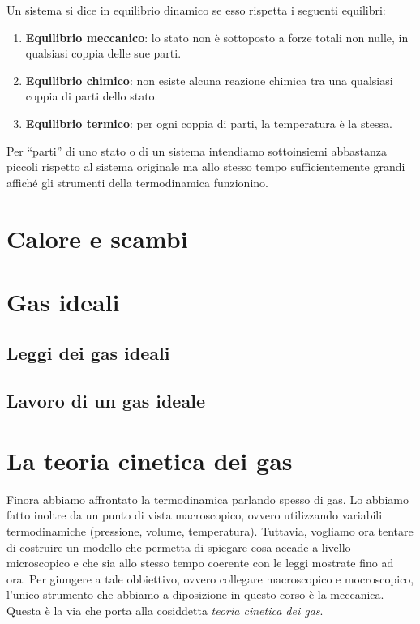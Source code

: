 Un sistema si dice in equilibrio dinamico se esso rispetta i seguenti equilibri:
\begin{enumerate}
    \item \textbf{Equilibrio meccanico}: lo stato non è sottoposto a forze totali non nulle,
    in qualsiasi coppia delle sue parti.

    \item \textbf{Equilibrio chimico}: non esiste alcuna reazione chimica tra una qualsiasi
    coppia di parti dello stato.

    \item \textbf{Equilibrio termico}: per ogni coppia di parti, la temperatura è la stessa.
\end{enumerate}

\noindent Per ``parti'' di uno stato o di un sistema intendiamo sottoinsiemi
abbastanza piccoli rispetto al sistema originale ma allo stesso tempo sufficientemente
grandi affiché gli strumenti della termodinamica funzionino.

\section*{Calore e scambi}
\section*{Gas ideali}
\subsection*{Leggi dei gas ideali}
\subsection*{Lavoro di un gas ideale}

\section*{La teoria cinetica dei gas}
Finora abbiamo affrontato la termodinamica parlando spesso di gas.
Lo abbiamo fatto inoltre da un punto di vista macroscopico, ovvero
utilizzando variabili termodinamiche (pressione, volume, temperatura).
Tuttavia, vogliamo ora tentare di costruire un modello che permetta
di spiegare cosa accade a livello microscopico e che sia allo stesso
tempo coerente con le leggi mostrate fino ad ora.
Per giungere a tale obbiettivo, ovvero collegare macroscopico e mocroscopico,
l'unico strumento che abbiamo a diposizione in questo corso è la meccanica.
Questa è la via che porta alla cosiddetta \textit{teoria cinetica dei
gas}.

